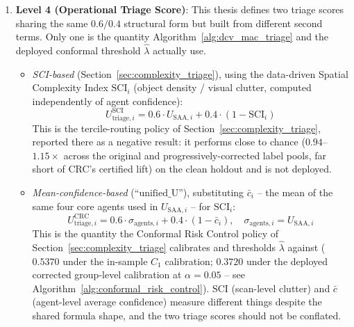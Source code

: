 \documentclass[12pt,a4paper]{report}
\begin{document}
\begin{enumerate}
    \item \textbf{Level 4 (Operational Triage Score)}: This thesis defines two triage scores sharing the same $0.6/0.4$ structural form but built from different second terms. Only one is the quantity Algorithm~\ref{alg:dcv_mac_triage} and the deployed conformal threshold $\hat\lambda$ actually use.
    \begin{itemize}
        \item \emph{SCI-based} (Section~\ref{sec:complexity_triage}), using the data-driven Spatial Complexity Index $\text{SCI}_i$ (object density / visual clutter, computed independently of agent confidence):
        \begin{equation}
            U_{\text{triage}, i}^{\text{SCI}} = 0.6 \cdot U_{\text{SAA}, i} + 0.4 \cdot (1 - \text{SCI}_i)
        \end{equation}
        This is the tercile-routing policy of Section~\ref{sec:complexity_triage}, reported there as a negative result: it performs close to chance ($0.94$--$1.15\times$ across the original and progressively-corrected label pools, far short of CRC's certified lift) on the clean holdout and is not deployed.
        \item \emph{Mean-confidence-based} (``$\text{unified\_U}$''), substituting $\bar{c}_i$ -- the mean of the same four core agents used in $U_{\text{SAA}, i}$ -- for $\text{SCI}_i$:
        \begin{equation}
            U_{\text{triage}, i}^{\text{CRC}} = 0.6 \cdot \sigma_{\text{agents}, i} + 0.4 \cdot (1 - \bar{c}_i), \quad \sigma_{\text{agents}, i} = U_{\text{SAA}, i}
        \end{equation}
        This is the quantity the Conformal Risk Control policy of Section~\ref{sec:complexity_triage} calibrates and thresholds $\hat\lambda$ against ($0.5370$ under the in-sample $C_1$ calibration; $0.3720$ under the deployed corrected group-level calibration at $\alpha=0.05$ -- see Algorithm~\ref{alg:conformal_risk_control}). $\text{SCI}$ (scan-level clutter) and $\bar c$ (agent-level average confidence) measure different things despite the shared formula shape, and the two triage scores should not be conflated.
    \end{itemize}
\end{enumerate}
\end{document}
